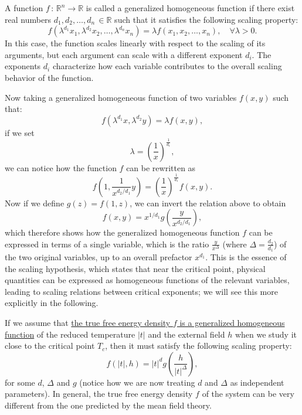 \begin{definition}
    A function \(f\,:\,\mathbb{R}^n \to \mathbb{R}\) is called a generalized homogeneous function if there exist real numbers \(d_1, d_2, \dots, d_n\, \in \mathbb{R}\) such that it satisfies the following scaling property:
    \[
        f(\lambda^{d_1} x_1, \lambda^{d_2} x_2, \dots, \lambda^{d_n} x_n) = \lambda f(x_1, x_2, \dots, x_n), \quad \forall \lambda > 0.
    \]
    In this case, the function scales linearly with respect to the scaling of its arguments, but each argument can scale with a different exponent \(d_i\). The exponents \(d_i\) characterize how each variable contributes to the overall scaling behavior of the function.

\end{definition}

Now taking a generalized homogeneous function of two variables \(f(x,y)\) such that:
\[
    f(\lambda^{d_1} x, \lambda^{d_2} y) = \lambda f(x,y),
\]
if we set
\[
    \lambda = \left(\frac{1}{x}\right)^{\frac{1}{d_1}},
\]
we can notice how the function \(f\) can be rewritten as
\[
    f(1, \frac{1}{x^{d_2/d_1}} y) = \left(\frac{1}{x}\right)^{\frac{1}{d_1}} f(x,y).
\]
Now if we define \(g(z)=f(1,z)\), we can invert the relation above to obtain
\[
    f(x,y) = x^{1/d_1} g\left(\frac{y}{x^{d_2/d_1}}\right),
\]
which therefore shows how the generalized homogeneous function \(f\) can be expressed in terms of a single variable, which is the ratio \(\frac{y}{x^{\Delta}}\) (where \(\Delta = \frac{d_2}{d_1}\)) of the two original variables, up to an overall prefactor \(x^{d_1}\). This is the essence of the scaling hypothesis, which states that near the critical point, physical quantities can be expressed as homogeneous functions of the relevant variables, leading to scaling relations between critical exponents; we will see this more explicitly in the following.

If we assume that \uline{the true free energy density \(f\) is a generalized homogeneous function} of the reduced temperature \(\vert t \vert\) and the external field \(h\) when we study it close to the critical point \(T_c\), then it must satisfy the following scaling property:
\[
    f(\vert t \vert, h) = \vert t \vert^{d} g\left(\frac{h}{\vert t \vert^{\Delta}}\right),
\]
for some \(d\), \(\Delta\) and \(g\) (notice how we are now treating \(d\) and \(\Delta\) as independent parameters). In general, the true free energy density \(f\) of the system can be very different from the one predicted by the mean field theory.

